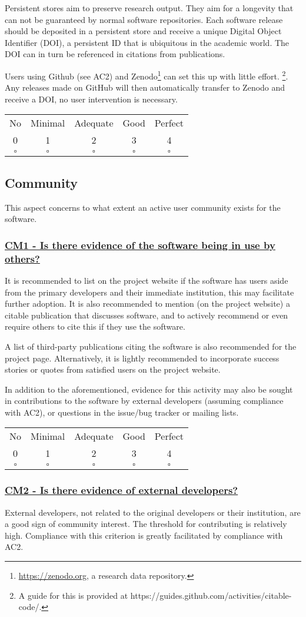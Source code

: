 \documentclass[a4paper,11pt]{article}
\newcommand{\criterion}[2]{\subsubsection*{\underline{#1 - #2}}\label{id:#1}}
\newcommand\CheckTable{%
  \begin{tabular}{ccccc}
    No & Minimal & Adequate & Good & Perfect \\
    0 & 1 & 2 & 3 & 4 \\
    \hline
    $\square$ & $\square$ & $\square$ & $\square$ & $\square$ \\
  \end{tabular}%
}
\begin{document}
Persistent stores aim to preserve research output. They aim for a longevity
that can not be guaranteed by normal software repositories. Each software
release should be deposited in a persistent store and receive a unique Digital
Object Identifier (DOI),  a persistent ID that is ubiquitous in the academic
world. The DOI can in turn be referenced in citations from publications.

Users using Github (see AC2) and Zenodo\footnote{\url{https://zenodo.org}, a
research data repository.} can set this up with little effort. \footnote{A guide
for this is provided at https://guides.github.com/activities/citable-code/.}.
Any releases made on GitHub will then automatically transfer to Zenodo and
receive a DOI, no user intervention is necessary. 

\CheckTable

\subsection{Community}\label{sec:com}

This aspect concerns to what extent an active user community exists for the
software.

\newcommand{\cmOneID}{CM1}
\newcommand{\cmOneText}{Is there evidence of the software being in use by others?}
\criterion{\cmOneID}{\cmOneText}

It is recommended to list on the project website if the software has 
users aside from the primary developers and their immediate institution, this
may facilitate further adoption. It is also recommended to mention (on the
project website) a citable publication that discusses software, and to actively
recommend or even require others to cite this if they use the software.

A list of third-party publications citing the software is also recommended for
the project page. Alternatively, it is lightly recommended to
incorporate success stories or quotes from satisfied users on the project
website.

In addition to the aforementioned, evidence for this activity may also be sought
in contributions to the software by external developers (assuming
compliance with AC2), or questions in the issue/bug tracker or mailing lists.

\CheckTable

\newcommand{\cmTwoID}{CM2}
\newcommand{\cmTwoText}{Is there evidence of external developers?}
\criterion{\cmTwoID}{\cmTwoText}

External developers, not related to the original developers or their
institution, are a good sign of community interest. The threshold for
contributing is relatively high. Compliance with this criterion is greatly
facilitated by compliance with AC2.
\end{document}
